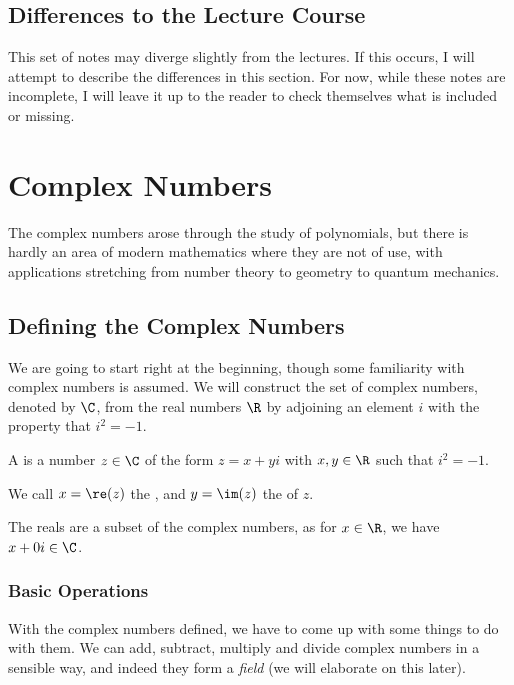 \documentclass[a4paper]{scrreprt}
\begin{document}
\section{Differences to the Lecture Course}

This set of notes may diverge slightly from the lectures. If this occurs, I will attempt to describe the differences in this section.
For now, while these notes are incomplete, I will leave it up to the reader to check themselves what is included or missing.  

\chapter{Complex Numbers}

The complex numbers arose through the study of polynomials, but there is hardly an area of modern mathematics where they are not of use, with applications stretching from number theory to geometry to quantum mechanics.


\section{Defining the Complex Numbers}

We are going to start right at the beginning, though some familiarity with complex numbers is assumed.
We will construct the set of complex numbers, denoted by $\C$, from the real numbers $\R$ by adjoining an element $i$ with the property that $i^2 = -1$.

\begin{definition}
	A  is a number $z \in \C$ of the form $z = x + yi$ with $x, y \in \R$ such that $i^2 = -1$. 
	
	We call $x = \re(z)$ the , and $y = \im(z)$ the  of $z$.
\end{definition}

The reals are a subset of the complex numbers, as for $x \in \R$, we have $x + 0i \in \C$. 

\subsection{Basic Operations}

With the complex numbers defined, we have to come up with some things to do with them.
We can add, subtract, multiply and divide complex numbers in a sensible way, and indeed they form a \emph{field} (we will elaborate on this later).
\end{document}
